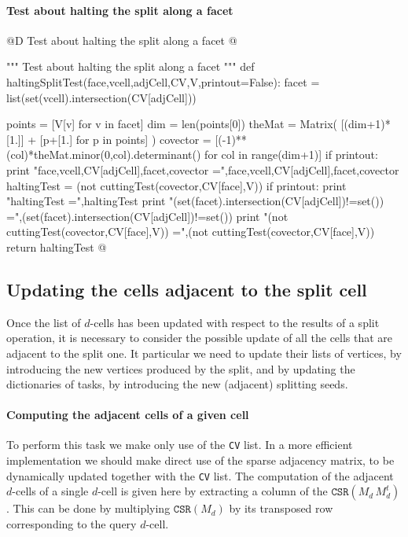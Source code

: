 \documentclass[11pt,oneside]{article}	%
\begin{document}
\paragraph{Test about halting the split along a facet}

@D Test about halting the split along a facet
@{""" Test about halting the split along a facet """
def haltingSplitTest(face,vcell,adjCell,CV,V,printout=False):
	facet = list(set(vcell).intersection(CV[adjCell]))
	
	points = [V[v] for v in facet]
	dim = len(points[0])
	theMat = Matrix( [(dim+1)*[1.]] + [p+[1.] for p in points] )
	covector = [(-1)**(col)*theMat.minor(0,col).determinant() 
						for col in range(dim+1)]
	if printout:
		print "face,vcell,CV[adjCell],facet,covector =",face,vcell,CV[adjCell],facet,covector
	haltingTest =  (not cuttingTest(covector,CV[face],V)) 
	if printout:
		print "haltingTest =",haltingTest
		print "(set(facet).intersection(CV[adjCell])!=set()) =",(set(facet).intersection(CV[adjCell])!=set())
		print "(not cuttingTest(covector,CV[face],V)) =",(not cuttingTest(covector,CV[face],V))
	return haltingTest
@}


\subsection{Updating the cells adjacent to the split cell}

Once the list of $d$-cells has been updated with respect to the results of a split operation, it is necessary to consider the possible update of all the cells that are adjacent to the split one.  It particular we need to update their lists of vertices, by introducing the new vertices produced by the split, and by updating the dictionaries of tasks, by introducing the new (adjacent) splitting seeds.

\paragraph{Computing the adjacent cells of a given cell}
To perform this task we make only use of the \texttt{CV} list. In a more efficient implementation we should make direct use of the sparse adjacency matrix, to be dynamically updated together with the \texttt{CV} list.
The computation of the adjacent $d$-cells of a single $d$-cell is given here by extracting a column of the $\texttt{CSR}(M_d\, M_d^t)$. This can be done by multiplying $\texttt{CSR}(M_d)$ by its transposed row corresponding to the query $d$-cell. 
\end{document}
